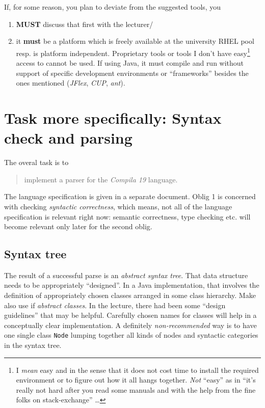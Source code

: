 \documentclass[10pt,freeform]{handout}[2014/08/13]
\begin{document}
If, for some reason, you plan to deviate from the suggested tools, you
\begin{enumerate}
\item \textbf{MUST} discuss that first with the lecturer/
\item it \textbf{must} be a platform which is freely available at the
  university RHEL pool resp. is  platform independent. Proprietary tools or
  tools I don't have easy\footnote{I \emph{mean} easy and in the sense that
    it does not cost time to install the required environment or to figure
    out how it all hangs together. \emph{Not} ``easy'' as in ``it's really
    not hard after you read some manuals and with the help from the fine
    folks on stack-exchange'' \ldots} access to cannot be used. If using Java, it
  must compile and run without support of specific development environments
  or ``frameworks'' besides the ones mentioned (\textsl{JFlex},
  \textsl{CUP}, \textsl{ant}).
\end{enumerate}



\section{Task more specifically: Syntax check and parsing}
\label{sec:task-more-spec}


The overal task is to 

\begin{quote}
  implement a parser for the \textsl{Compila 19} language.
\end{quote}
The language specification is given in a separate document. Oblig 1 is
concerned with checking \emph{syntactic correctness}, which means, not all
of the language specification is relevant right now: semantic correctness,
type checking etc. will become relevant only later for the second oblig.


\subsection{Syntax tree}
\label{sec:syntax-tree}

The result of a successful parse is an \emph{abstract syntax tree}. That
data structure needs to be appropriately ``designed''. In a Java
implementation, that involves the definition of appropriately chosen
classes arranged in some class hierarchy. Make also use if \emph{abstract
  classes}. In the lecture, there had been some ``design guidelines'' that
may be helpful. Carefully chosen names for classes will help in a
conceptually clear implementation. A definitely \emph{non-recommended} way
is to have one single class \texttt{Node} lumping together all kinds of
nodes and syntactic categories in the syntax tree.
\end{document}
